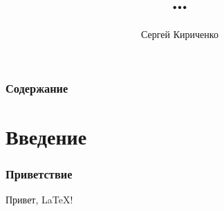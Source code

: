 \documentclass{markov}
\title{\ldots}
\author{Сергей Кириченко}
\institute{МГТУ им. Баумана}
\begin{document}
    \frame\titlepage

    \begin{frame}
        \frametitle{Содержание}
        \tableofcontents
    \end{frame}

    \section{Введение}

    \begin{frame}
        \frametitle{Приветствие}
        Привет, \LaTeX!
    \end{frame}
\end{document}

